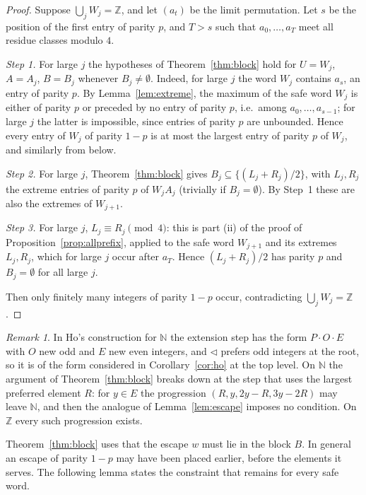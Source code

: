 \documentclass[11pt]{amsart}
\theoremstyle{definition}
\theoremstyle{remark}
\newtheorem{remark}[theorem]{Remark}
\newcommand{\Z}{\mathbb{Z}}
\newcommand{\N}{\mathbb{N}}
\begin{document}
\begin{proof}
Suppose $\bigcup_j W_j=\Z$, and let $(a_t)$ be the limit permutation. Let $s$ be the position of the first entry of parity $p$, and $T>s$ such that $a_0,\dots,a_T$ meet all residue classes modulo $4$.

\emph{Step 1.} For large $j$ the hypotheses of Theorem~\ref{thm:block} hold for $U=W_j$, $A=A_j$, $B=B_j$ whenever $B_j\ne\emptyset$. Indeed, for large $j$ the word $W_j$ contains $a_s$, an entry of parity $p$. By Lemma~\ref{lem:extreme}, the maximum of the safe word $W_j$ is either of parity $p$ or preceded by no entry of parity $p$, i.e.\ among $a_0,\dots,a_{s-1}$; for large $j$ the latter is impossible, since entries of parity $p$ are unbounded. Hence every entry of $W_j$ of parity $1-p$ is at most the largest entry of parity $p$ of $W_j$, and similarly from below.

\emph{Step 2.} For large $j$, Theorem~\ref{thm:block} gives $B_j\subseteq\{(L_j+R_j)/2\}$, with $L_j,R_j$ the extreme entries of parity $p$ of $W_jA_j$ (trivially if $B_j=\emptyset$). By Step~1 these are also the extremes of $W_{j+1}$.

\emph{Step 3.} For large $j$, $L_j\equiv R_j\pmod 4$: this is part (ii) of the proof of Proposition~\ref{prop:allprefix}, applied to the safe word $W_{j+1}$ and its extremes $L_j,R_j$, which for large $j$ occur after $a_T$. Hence $(L_j+R_j)/2$ has parity $p$ and $B_j=\emptyset$ for all large $j$.

Then only finitely many integers of parity $1-p$ occur, contradicting $\bigcup_jW_j=\Z$.
\end{proof}

\begin{remark}
In Ho's construction for $\N$ \cite[Algorithm~1]{Ho26} the extension step has the form $P\cdot O\cdot E$ with $O$ new odd and $E$ new even integers, and $\lhd$ prefers odd integers at the root, so it is of the form considered in Corollary~\ref{cor:ho} at the top level. On $\N$ the argument of Theorem~\ref{thm:block} breaks down at the step that uses the largest preferred element $R$: for $y\in E$ the progression $(R,y,2y-R,3y-2R)$ may leave $\N$, and then the analogue of Lemma~\ref{lem:escape} imposes no condition. On $\Z$ every such progression exists.
\end{remark}

Theorem~\ref{thm:block} uses that the escape $w$ must lie in the block $B$. In general an escape of parity $1-p$ may have been placed earlier, before the elements it serves. The following lemma states the constraint that remains for every safe word.
\end{document}
